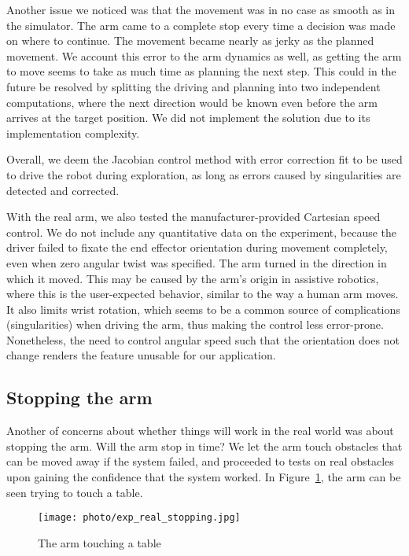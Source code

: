\documentclass[buriama8_dp.tex]{subfiles}
\begin{document}
Another issue we noticed was that the movement was in no case as smooth as in the simulator. The arm came to a complete stop every time a decision was made on where to continue. The movement became nearly as jerky as the planned movement. We account this error to the arm dynamics as well, as getting the arm to move seems to take as much time as planning the next step. This could in the future be resolved by splitting the driving and planning into two independent computations, where the next direction would be known even before the arm arrives at the target position. We did not implement the solution due to its implementation complexity.

Overall, we deem the Jacobian control method with error correction fit to be used to drive the robot during exploration, as long as errors caused by singularities are detected and corrected.

With the real arm, we also tested the manufacturer-provided Cartesian speed control. We do not include any quantitative data on the experiment, because the driver failed to fixate the end effector orientation during movement completely, even when zero angular twist was specified. The arm turned in the direction in which it moved. This may be caused by the arm's origin in assistive robotics, where this is the user-expected behavior, similar to the way a human arm moves. It also limits wrist rotation, which seems to be a common source of complications (singularities) when driving the arm, thus making the control less error-prone. Nonetheless, the need to control angular speed such that the orientation does not change renders the feature unusable for our application.

\subsection{Stopping the arm}
\label{subsec:exp_stop}

Another of concerns about whether things will work in the real world was about stopping the arm. Will the arm stop in time? We let the arm touch obstacles that can be moved away if the system failed, and proceeded to tests on real obstacles upon gaining the confidence that the system worked. In Figure~\ref{fig:exp_stop}, the arm can be seen trying to touch a table.

\begin{figure}[ht]
  \centering
  \texttt{[image: photo/exp\_real\_stopping.jpg]}
  \caption{The arm touching a table}
  \label{fig:exp_stop}
\end{figure}
\end{document}
